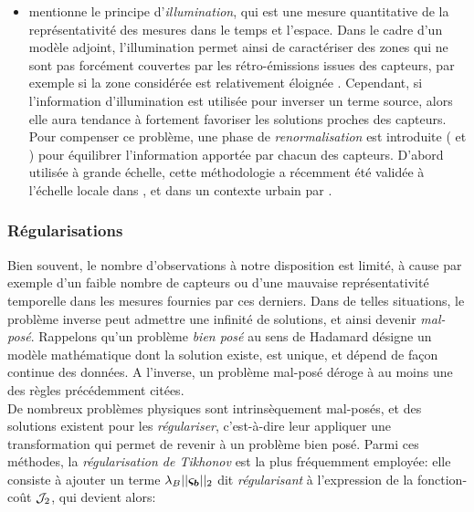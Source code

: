 \begin{itemize}
	 \item \cite{Issartel2005} mentionne le principe d'\textit{illumination}, qui est une mesure quantitative de la représentativité des mesures dans le temps et l'espace. Dans le cadre d'un modèle adjoint, l'illumination permet ainsi de caractériser des zones qui ne sont pas forcément couvertes par les rétro-émissions issues des capteurs, par exemple si la zone considérée est relativement éloignée . Cependant, si l'information d'illumination est utilisée pour inverser un terme source, alors elle aura tendance à fortement favoriser les solutions proches des capteurs. Pour compenser ce problème, une phase de \textit{renormalisation} est introduite (\cite{Issartel2007} et \cite{Sharan2009}) pour équilibrer l'information apportée par chacun des capteurs. D'abord utilisée à grande échelle, cette méthodologie a récemment été validée à l'échelle locale dans \cite{Singh2014}, et dans un contexte urbain par \cite{Kumar2015}. \\

\end{itemize}

\subsubsection{Régularisations}

Bien souvent, le nombre d'observations à notre disposition est limité, à cause par exemple d'un faible nombre de capteurs ou d'une mauvaise représentativité temporelle dans les mesures fournies par ces derniers. Dans de telles situations, le problème inverse peut admettre une infinité de solutions, et ainsi devenir \textit{mal-posé}. Rappelons qu'un problème \textit{bien posé} au sens de Hadamard \cite{Hadamard1902} désigne un modèle mathématique dont la solution existe, est unique, et dépend de façon continue des données. A l'inverse, un problème mal-posé déroge à au moins une des règles précédemment citées. \\

De nombreux problèmes physiques sont intrinsèquement mal-posés, et des solutions existent pour les \textit{régulariser}, c'est-à-dire leur appliquer une transformation qui permet de revenir à un problème bien posé. Parmi ces méthodes, la \textit{régularisation de Tikhonov} \cite{Tikhonov1963} est la plus fréquemment employée: elle consiste à ajouter un terme $\lambda_B ||{\bm{\varsigma_b}}||_2$ dit \textit{régularisant} à l'expression de la fonction-coût ${\mathcal{J}}_2$, qui devient alors:

